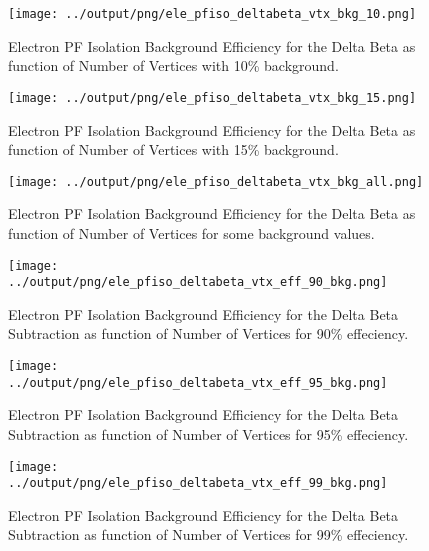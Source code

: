 \documentclass[11pt]{book}
\begin{document}
\begin{figure}[htb]
\centering
\texttt{[image: ../output/png/ele\_pfiso\_deltabeta\_vtx\_bkg\_10.png]}
\caption{Electron PF Isolation Background Efficiency for the Delta Beta as function of Number of Vertices with 10\% background.}
\label{fig:ele_pfiso_vtx_bkg_deltabeta_bkg_10}
\end{figure}

\begin{figure}[htb]
\centering
\texttt{[image: ../output/png/ele\_pfiso\_deltabeta\_vtx\_bkg\_15.png]}
\caption{Electron PF Isolation Background Efficiency for the Delta Beta as function of Number of Vertices with 15\% background.}
\label{fig:ele_pfiso_vtx_bkg_deltabeta_bkg_15}
\end{figure}

\begin{figure}[htb]
\centering
\texttt{[image: ../output/png/ele\_pfiso\_deltabeta\_vtx\_bkg\_all.png]}
\caption{Electron PF Isolation Background Efficiency for the Delta Beta as function of Number of Vertices for some background values.}
\label{fig:ele_pfiso_vtx_bkg_deltabeta_bkg_all}
\end{figure}

\begin{figure}[htb]
\centering
\texttt{[image: ../output/png/ele\_pfiso\_deltabeta\_vtx\_eff\_90\_bkg.png]}
\caption{Electron PF Isolation Background Efficiency for the Delta Beta Subtraction as function of Number of Vertices for 90\% effeciency.}
\label{fig:ele_pfiso_vtx_eff_deltabeta_eff_90_bkg}
\end{figure}

\begin{figure}[htb]
\centering
\texttt{[image: ../output/png/ele\_pfiso\_deltabeta\_vtx\_eff\_95\_bkg.png]}
\caption{Electron PF Isolation Background Efficiency for the Delta Beta Subtraction as function of Number of Vertices for 95\% effeciency.}
\label{fig:ele_pfiso_vtx_eff_deltabeta_eff_95_bkg}
\end{figure}

\begin{figure}[htb]
\centering
\texttt{[image: ../output/png/ele\_pfiso\_deltabeta\_vtx\_eff\_99\_bkg.png]}
\caption{Electron PF Isolation Background Efficiency for the Delta Beta Subtraction as function of Number of Vertices for 99\% effeciency.}
\label{fig:ele_pfiso_vtx_eff_deltabeta_eff_99_bkg}
\end{figure}
\end{document}
